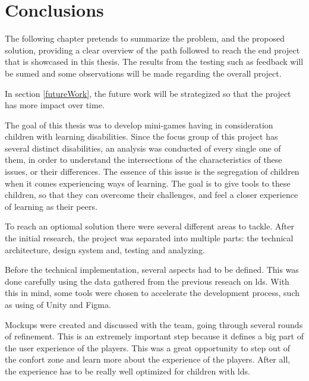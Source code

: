 \chapter{Conclusions}
\label{cha:conclusions}

The following chapter pretends to summarize the problem, and the proposed solution, providing a clear overview of the path followed to reach the end project that is showcased in this thesis.
The results from the testing such as feedback will be sumed and some observations will be made regarding the overall project.

In section \ref{futureWork}, the future work will be strategized so that the project has more impact over time.


The goal of this thesis was to develop mini-games having in consideration children with learning disabilities. Since the focus group of this project has several distinct disabilities, an analysis was conducted of every single one of them, in order to understand the intersections of the characteristics of these issues, or their differences. The essence of this issue is the segregation of children when it comes experiencing ways of learning. The goal is to give tools to these children, so that they can overcome their challenges, and feel a closer experience of learning as their peers.

To reach an optiomal solution there were several different areas to tackle. After the initial research, the project was separated into multiple parts: the technical architecture, design system and, testing and analyzing.

Before the technical implementation, several aspects had to be defined. This was done carefully using the data gathered from the previous reseach on \glspl{ld}. With this in mind, some tools were chosen to accelerate the development process, such as using of Unity and Figma.

Mockups were created and discussed with the team, going through several rounds of refinement. This is an extremely important step because it defines a big part of the user experience of the players. This was a great opportunity to step out of the confort zone and learn more about the experience of the players. After all, the experience has to be really well optimized for children with \glspl{ld}.

